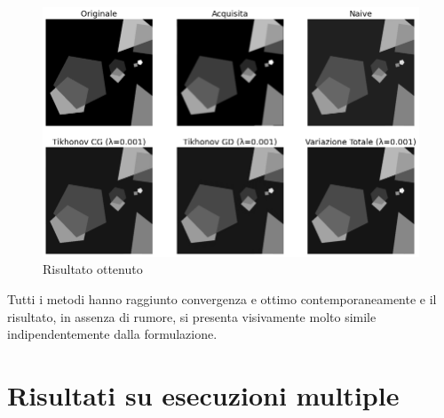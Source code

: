 \documentclass[11pt]{article}
\begin{document}
\begin{figure}[H]
    \centering
    \includegraphics[width=12cm]{semiconvergenza/3/deblur_all.png}
    \caption{Risultato ottenuto}
    \label{fig:semiconv_deblur3}
\end{figure}
Tutti i metodi hanno raggiunto convergenza e ottimo contemporaneamente e il risultato, in assenza di rumore, si presenta visivamente molto simile indipendentemente dalla formulazione.



\newpage
\section{Risultati su esecuzioni multiple}
\end{document}
